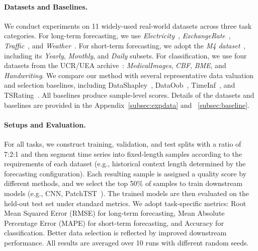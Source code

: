 \documentclass{article}
\begin{document}
\paragraph{Datasets and Baselines.}
We conduct experiments on 11 widely-used real-world datasets across three task categories. For long-term forecasting, we use \textit{Electricity}~\citep{trindade2015electricityloaddiagrams20112014}, \textit{ExchangeRate}~\citep{lai2018modeling}, \textit{Traffic}~\citep{traffic_data}, and \textit{Weather}~\citep{weather_data}. For short-term forecasting, we adopt the \textit{M4 dataset}~\citep{makridakis2018m4}, including its \textit{Yearly}, \textit{Monthly}, and \textit{Daily} subsets. For classification, we use four datasets from the UCR/UEA archive~\citep{ismail2019deep,ucr_uea}: \textit{MedicalImages}, \textit{CBF}, \textit{BME}, and \textit{Handwriting}.
We compare our method with several representative data valuation and selection baselines, including DataShapley~\citep{ghorbani2019data}, DataOob~\citep{kwon2024datainf}, TimeInf~\citep{zhang2025timeinf}, and TSRating~\citep{wu2026rating}. All baselines produce sample-level scores. Details of the datasets and baselines are provided in the Appendix~\ref{subsec:expdata} and ~\ref{subsec:baseline}.

\paragraph{Setups and Evaluation.}

For all tasks, we construct training, validation, and test splits with a ratio of 7:2:1 and then segment time series into fixed-length samples according to the requirements of each dataset (e.g., historical context length determined by the forecasting configuration). Each resulting sample is assigned a quality score by different methods, and we select the top 50\% of samples to train downstream models (e.g., CNN, PatchTST~\citep{nie2023time}). The trained models are then evaluated on the held-out test set under standard metrics. We adopt task-specific metrics: Root Mean Squared Error (RMSE) for long-term forecasting, Mean Absolute Percentage Error (MAPE) for short-term forecasting, and Accuracy for classification. Better data selection is reflected by improved downstream performance. All results are averaged over 10 runs with different random seeds.
\end{document}
